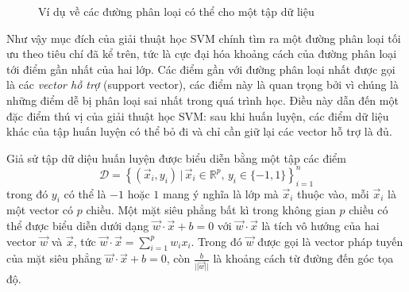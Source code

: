 \begin{figure}[ht]
\begin{subfigure}[b]{0.32\textwidth}
{
}
\end{subfigure}
\begin{subfigure}[b]{0.32\textwidth}
\centering
{}
\end{subfigure}
\caption{Ví dụ về các đường phân loại có thể cho một tập dữ liệu\label{sep-eg}}
\end{figure}

Như vậy mục đích của giải thuật học SVM chính tìm ra một đường phân loại tối ưu theo tiêu chí đã kể trên, tức là cực đại hóa khoảng cách của đường phân loại tới điểm gần nhất của hai lớp. Các điểm gần với đường phân loại nhất được gọi là các \emph{vector hỗ trợ} (support vector), các điểm này là quan trọng bởi vì chúng là những điểm dễ bị phân loại sai nhất trong quá trình học. Điều này dẫn đến một đặc điểm thú vị của giải thuật học SVM: sau khi huấn luyện, các điểm dữ liệu khác của tập huấn luyện có thể bỏ đi và chỉ cần giữ lại các vector hỗ trợ là đủ.

Giả sử tập dữ diệu huấn luyện được biểu diễn bằng một tập các điểm \[\mathcal{D}=\left\{(\vec{x}_i,y_i)\,|\,\vec{x}_i\in\mathbb{R}^p,\,y_i\in\{-1,1\}\right\}_{i=1}^{n}\] trong đó $y_i$ có thể là $-1$ hoặc $1$ mang ý nghĩa là lớp mà $\vec{x}_i$ thuộc vào, mỗi $\vec{x}_i$ là một vector có $p$ chiều. Một mặt siêu phẳng bất kì trong không gian $p$ chiều có thể được biểu diễn dưới dạng $\vec{w}\cdot\vec{x}+b=0$ với $\vec{w}\cdot\vec{x}$ là tích vô hướng của hai vector $\vec{w}$ và $\vec{x}$, tức $\vec{w}\cdot\vec{x}=\sum_{i=1}^{p}w_ix_i$. Trong đó $\vec{w}$ được gọi là vector pháp tuyến của mặt siêu phẳng $\vec{w}\cdot\vec{x}+b=0$, còn $\frac{b}{||\vec{w}||}$ là khoảng cách từ đường đến góc tọa độ.

